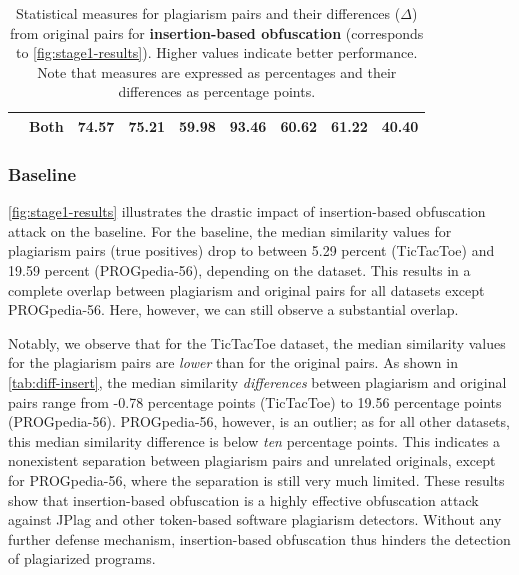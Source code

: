 \begin{table}[h]
\begin{tabular}{lrrrrrrrr}
		                               & Both     & \textbf{74.57}      & \textbf{75.21}     & \textbf{59.98}      & \textbf{93.46}      & \textbf{60.62}         & \textbf{61.22}           & \textbf{40.40}        \\  
		\bottomrule  
	\end{tabular}
	\caption[Evaluation Results: Insertion-based Obfuscation]{Statistical measures for plagiarism pairs and their differences ($\Delta$) from original pairs for \textbf{insertion-based obfuscation} (corresponds to \autoref{fig:stage1-results}). Higher values indicate better performance. Note that measures are expressed as percentages and their differences as percentage points.}
	\label{tab:diff-insert}
\end{table}



 


\subsubsection{Baseline}
\autoref{fig:stage1-results} illustrates the drastic impact of insertion-based obfuscation attack on the baseline.
For the baseline, the median similarity values for plagiarism pairs (true positives) drop to between 5.29 percent (TicTacToe) and 19.59 percent (PROGpedia-56), depending on the dataset.
This results in a complete overlap between plagiarism and original pairs for all datasets except PROGpedia-56. Here, however, we can still observe a substantial overlap.

Notably, we observe that for the TicTacToe dataset, the median similarity values for the plagiarism pairs are \textit{lower} than for the original pairs.
As shown in \autoref{tab:diff-insert}, the median similarity \textit{differences} between plagiarism and original pairs range from -0.78 percentage points (TicTacToe) to 19.56 percentage points (PROGpedia-56). PROGpedia-56, however, is an outlier; as for all other datasets, this median similarity difference is below \textit{ten} percentage points. This indicates a nonexistent separation between plagiarism pairs and unrelated originals, except for PROGpedia-56, where the separation is still very much limited.
These results show that insertion-based obfuscation is a highly effective obfuscation attack against JPlag and other token-based software plagiarism detectors.
Without any further defense mechanism, insertion-based obfuscation thus hinders the detection of plagiarized programs.


